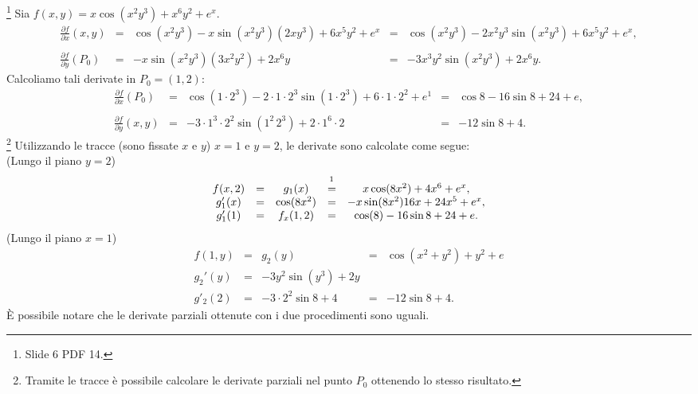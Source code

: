 \begin{example}\footnote{Slide 6 PDF 14.}
    Sia $f(x,y)=x\cos(x^2y^3)+x^6y^2+e^x$.
    \begin{equation}\label{eq:derivate_parziali_metodo_normale}
        \begin{matrix}
            \frac{\partial f}{\partial x}(x,y)&=& \cos(x^2y^3)-x\sin(x^2y^3)(2xy^3)+6x^5y^2+e^x&=&\cos(x^2y^3)-2x^2y^3\sin(x^2y^3)+6x^5y^2+e^x,\\\\
            \frac{\partial f}{\partial y}(P_0)&=& -x\sin(x^2y^3)(3x^2y^2)+2x^6y&=&-3x^3y^2\sin(x^2y^3)+2x^6y.
        \end{matrix}
    \end{equation}
    Calcoliamo tali derivate in $P_0=(1,2)$:
    \begin{equation*}
        \begin{matrix}
            \frac{\partial f}{\partial x}(P_0)&=& \cos(1\cdot 2^3)-2\cdot 1\cdot 2^3\sin(1\cdot 2^3)+6\cdot 1\cdot 2^2+e^1&=&\cos8 -16\sin8+24+ e,\\\\
            \frac{\partial f}{\partial y}(x,y)&=&-3\cdot 1^3\cdot 2^2\sin(1^2\,2^3)+2\cdot1^6\cdot2 &=&-12\sin8+4.
        \end{matrix}
    \end{equation*}
    \footnote{Tramite le tracce è possibile calcolare le derivate parziali nel punto $P_0$ ottenendo lo stesso risultato.}
    Utilizzando le tracce (sono fissate $x$ e $y$) $x=1$ e $y=2$, le  derivate sono calcolate come segue:\\
    (Lungo il piano $y=2$)
    \begin{equation*}
        \begin{matrix}
            f(x,2)&=&g_1(x)&\overset{\footnotemark}{=}&x\cos(8x^2)+4x^6+e^x,\\
            g'_1(x)&=&\cos(8x^2)&=&-x\sin(8x^2)16x+24x^5+e^x,\\
            g'_1(1)&=& f_x(1,2)&=& \cos(8)-16\sin8+24+e.
        \end{matrix}
    \end{equation*}
     (Lungo il piano  $x=1$)
    \begin{equation*}
        \begin{matrix}
            f(1,y) &=& g_2(y) &=& \cos(x^2+y^2)+y^2+e\\
            g_2'(y) &=& -3y^2\sin(y^3)+2y\\
            g'_2(2) &=& -3\cdot 2^2\sin 8+ 4 &=& -12\sin 8+4.
        \end{matrix}
    \end{equation*}
    È possibile notare che le derivate parziali ottenute con i due procedimenti sono uguali.
\end{example}
